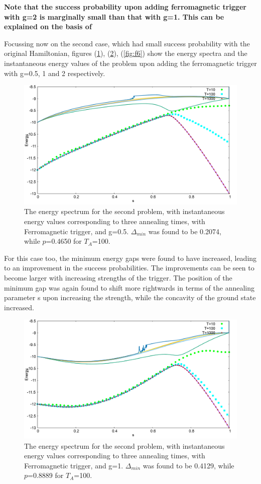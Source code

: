 \documentclass[12]{article}
\begin{document}
\textbf{Note that the success probability upon adding ferromagnetic trigger with g=2 is marginally small than that with g=1. This can be explained on the basis of}


Focussing now on the second case, which had small success probability with the original Hamiltonian, figures (\ref{fig:f4}), (\ref{fig:f5}), (\ref{fig:f6}) show the energy spectra and the instantaneous energy values of the problem upon adding the ferromagnetic trigger with g=0.5, 1 and 2 respectively. 
\begin{figure}[H]
\centering 
\includegraphics[scale=0.3]{950_s12_F_g0.png}
\caption{The energy spectrum for the second problem, with instantaneous energy values corresponding to three annealing times, with Ferromagnetic trigger, and g=0.5. $\Delta_{min}$ was found to be 0.2074, while $p$=0.4650 for $T_A$=100.}
\label{fig:f4}
\end{figure}
For this case too, the minimum energy gaps were found to have increased, leading to an improvement in the success probabilities. The improvements can be seen to become larger with increasing strengths of the trigger. The position of the minimum gap was again found to shift more rightwards in terms of the annealing parameter s upon increasing the strength, while the concavity of the ground state increased. \\
\begin{figure}[H]
\centering 
\includegraphics[scale=0.3]{950_s12_F_g1.png}
\caption{The energy spectrum for the second problem, with instantaneous energy values corresponding to three annealing times, with Ferromagnetic trigger, and g=1. $\Delta_{min}$ was found to be 0.4129, while $p$=0.8889 for $T_A$=100.}
\label{fig:f5}
\end{figure}
\end{document}
